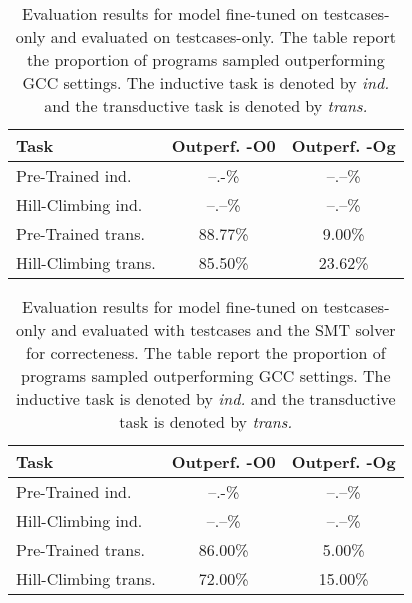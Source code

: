 \documentclass{article}
\begin{document}
\begin{table}[t]
\label{tab:random_generation_results}
\caption{Evaluation results for model fine-tuned on testcases-only and evaluated on testcases-only. The table report the proportion of programs sampled outperforming GCC settings. The inductive task is denoted by \textit{ind.} and the transductive task is denoted by \textit{trans.}}
\vskip 0.15in
\begin{center}
\begin{small}
\begin{sc}
\begin{tabular}{lcc}
\toprule
Task & Outperf. -O0 & Outperf. -Og \\
\midrule
Pre-Trained ind.    & --.-\% & --.--\% \\
Hill-Climbing ind.  & --.--\% & --.--\% \\
Pre-Trained trans.   & 88.77\% & 9.00\% \\
Hill-Climbing trans.  & 85.50\% & 23.62\% \\
\bottomrule
\end{tabular}
\end{sc}
\end{small}
\end{center}
\vskip -0.1in
\end{table}


\begin{table}[t]
\label{tab:z3_results}
\caption{Evaluation results for model fine-tuned on testcases-only and evaluated with testcases and the SMT solver for correcteness. The table report the proportion of programs sampled outperforming GCC settings. The inductive task is denoted by \textit{ind.} and the transductive task is denoted by \textit{trans.}}
\vskip 0.15in
\begin{center}
\begin{small}
\begin{sc}
\begin{tabular}{lcc}
\toprule
Task & Outperf. -O0 & Outperf. -Og \\
\midrule
Pre-Trained ind.    & --.-\% & --.--\% \\
Hill-Climbing ind.  & --.--\% & --.--\% \\
Pre-Trained trans.   & 86.00\% & 5.00\% \\
Hill-Climbing trans.  & 72.00\% & 15.00\% \\
\bottomrule
\end{tabular}
\end{sc}
\end{small}
\end{center}
\vskip -0.1in
\end{table}
\end{document}
